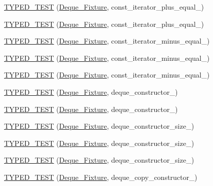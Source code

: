 \begin{DoxyCompactItemize}
\hyperlink{TestDeque_8c_09_09_a3e2aa1da2651f015562b199f90a1fb1e}{T\-Y\-P\-E\-D\-\_\-\-T\-E\-S\-T} (\hyperlink{structDeque__Fixture}{Deque\-\_\-\-Fixture}, const\-\_\-iterator\-\_\-plus\-\_\-equal\-\_)
\item 
\hyperlink{TestDeque_8c_09_09_ab43c0fe733ccae927c0c3cea394ddceb}{T\-Y\-P\-E\-D\-\_\-\-T\-E\-S\-T} (\hyperlink{structDeque__Fixture}{Deque\-\_\-\-Fixture}, const\-\_\-iterator\-\_\-plus\-\_\-equal\-\_)
\item 
\hyperlink{TestDeque_8c_09_09_a3b4d1cd94116a45762c46a0f1201e177}{T\-Y\-P\-E\-D\-\_\-\-T\-E\-S\-T} (\hyperlink{structDeque__Fixture}{Deque\-\_\-\-Fixture}, const\-\_\-iterator\-\_\-minus\-\_\-equal\-\_)
\item 
\hyperlink{TestDeque_8c_09_09_a549e2b635cc5236fc4bb149ac6f3c945}{T\-Y\-P\-E\-D\-\_\-\-T\-E\-S\-T} (\hyperlink{structDeque__Fixture}{Deque\-\_\-\-Fixture}, const\-\_\-iterator\-\_\-minus\-\_\-equal\-\_)
\item 
\hyperlink{TestDeque_8c_09_09_a5c820c69c17a5759e12299ea785c6e38}{T\-Y\-P\-E\-D\-\_\-\-T\-E\-S\-T} (\hyperlink{structDeque__Fixture}{Deque\-\_\-\-Fixture}, const\-\_\-iterator\-\_\-minus\-\_\-equal\-\_)
\item 
\hyperlink{TestDeque_8c_09_09_a76cfb205269498fb42931acdea0991c3}{T\-Y\-P\-E\-D\-\_\-\-T\-E\-S\-T} (\hyperlink{structDeque__Fixture}{Deque\-\_\-\-Fixture}, deque\-\_\-constructor\-\_)
\item 
\hyperlink{TestDeque_8c_09_09_aa88933c251c7531d6d4e8f53d04a6ec1}{T\-Y\-P\-E\-D\-\_\-\-T\-E\-S\-T} (\hyperlink{structDeque__Fixture}{Deque\-\_\-\-Fixture}, deque\-\_\-constructor\-\_)
\item 
\hyperlink{TestDeque_8c_09_09_a00f6b839e0c0ae378b5f867ae324638a}{T\-Y\-P\-E\-D\-\_\-\-T\-E\-S\-T} (\hyperlink{structDeque__Fixture}{Deque\-\_\-\-Fixture}, deque\-\_\-constructor\-\_\-size\-\_)
\item 
\hyperlink{TestDeque_8c_09_09_a2fd76a5ad0f950e2c2ed79f4a3fab5c5}{T\-Y\-P\-E\-D\-\_\-\-T\-E\-S\-T} (\hyperlink{structDeque__Fixture}{Deque\-\_\-\-Fixture}, deque\-\_\-constructor\-\_\-size\-\_)
\item 
\hyperlink{TestDeque_8c_09_09_a12284d381ea9e933849a271ce5662f24}{T\-Y\-P\-E\-D\-\_\-\-T\-E\-S\-T} (\hyperlink{structDeque__Fixture}{Deque\-\_\-\-Fixture}, deque\-\_\-constructor\-\_\-size\-\_)
\item 
\hyperlink{TestDeque_8c_09_09_a03ff63e410279c9833a151ae897484be}{T\-Y\-P\-E\-D\-\_\-\-T\-E\-S\-T} (\hyperlink{structDeque__Fixture}{Deque\-\_\-\-Fixture}, deque\-\_\-copy\-\_\-constructor\-\_)

\end{DoxyCompactItemize}

